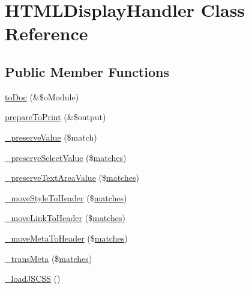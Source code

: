 \hypertarget{classHTMLDisplayHandler}{}\section{H\+T\+M\+L\+Display\+Handler Class Reference}
\label{classHTMLDisplayHandler}
\subsection*{Public Member Functions}
\begin{DoxyCompactItemize}
\item 
\hyperlink{classHTMLDisplayHandler_a01d7fabb31ab447663f866efa36118a3}{to\+Doc} (\&\$o\+Module)
\item 
\hyperlink{classHTMLDisplayHandler_a92daeef7b0da4840345986d1966ecf0c}{prepare\+To\+Print} (\&\$output)
\item 
\hyperlink{classHTMLDisplayHandler_aa99a0e119ab322b0e323d1109f668a35}{\+\_\+preserve\+Value} (\$match)
\item 
\hyperlink{classHTMLDisplayHandler_ab9baa231fb3294a6efcf9062b4ec7b89}{\+\_\+preserve\+Select\+Value} (\$\hyperlink{jquery_8mobile_8customized_8min_8js_a0dd9fb10d0da7ad1a1c71aad2c6388f7}{matches})
\item 
\hyperlink{classHTMLDisplayHandler_a45d8439c35b8be8f97aeca3fb4e8dd7f}{\+\_\+preserve\+Text\+Area\+Value} (\$\hyperlink{jquery_8mobile_8customized_8min_8js_a0dd9fb10d0da7ad1a1c71aad2c6388f7}{matches})
\item 
\hyperlink{classHTMLDisplayHandler_a68e7b6f173d231d71572509067a203f4}{\+\_\+move\+Style\+To\+Header} (\$\hyperlink{jquery_8mobile_8customized_8min_8js_a0dd9fb10d0da7ad1a1c71aad2c6388f7}{matches})
\item 
\hyperlink{classHTMLDisplayHandler_a6ea4cd64e8099e5ded248ec376772913}{\+\_\+move\+Link\+To\+Header} (\$\hyperlink{jquery_8mobile_8customized_8min_8js_a0dd9fb10d0da7ad1a1c71aad2c6388f7}{matches})
\item 
\hyperlink{classHTMLDisplayHandler_a95922f4ce120e4cd0e08ed328282a003}{\+\_\+move\+Meta\+To\+Header} (\$\hyperlink{jquery_8mobile_8customized_8min_8js_a0dd9fb10d0da7ad1a1c71aad2c6388f7}{matches})
\item 
\hyperlink{classHTMLDisplayHandler_aa80671d70e293852abad65f4c79f5631}{\+\_\+trans\+Meta} (\$\hyperlink{jquery_8mobile_8customized_8min_8js_a0dd9fb10d0da7ad1a1c71aad2c6388f7}{matches})
\item 
\hyperlink{classHTMLDisplayHandler_a061f7f11230af884eb1784a2d495fbfd}{\+\_\+load\+J\+S\+C\+SS} ()
\end{DoxyCompactItemize}


